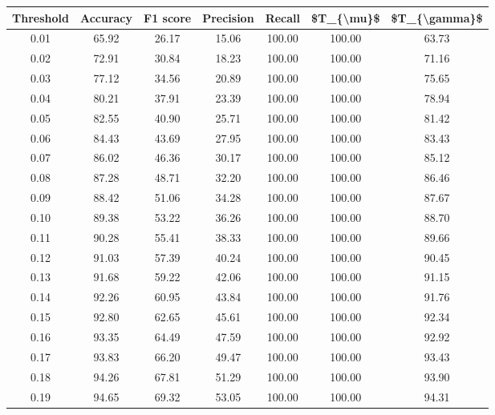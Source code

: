 \begin{tabular}{|c|c|c|c|c|c|c|}
\hline
 Threshold &  Accuracy &  F1 score &  Precision &  Recall &  \$T\_\{\textbackslash mu\}\$ &  \$T\_\{\textbackslash gamma\}\$ \\
\hline
      0.01 &     65.92 &     26.17 &      15.06 &  100.00 &     100.00 &         63.73 \\
      0.02 &     72.91 &     30.84 &      18.23 &  100.00 &     100.00 &         71.16 \\
      0.03 &     77.12 &     34.56 &      20.89 &  100.00 &     100.00 &         75.65 \\
      0.04 &     80.21 &     37.91 &      23.39 &  100.00 &     100.00 &         78.94 \\
      0.05 &     82.55 &     40.90 &      25.71 &  100.00 &     100.00 &         81.42 \\
      0.06 &     84.43 &     43.69 &      27.95 &  100.00 &     100.00 &         83.43 \\
      0.07 &     86.02 &     46.36 &      30.17 &  100.00 &     100.00 &         85.12 \\
      0.08 &     87.28 &     48.71 &      32.20 &  100.00 &     100.00 &         86.46 \\
      0.09 &     88.42 &     51.06 &      34.28 &  100.00 &     100.00 &         87.67 \\
      0.10 &     89.38 &     53.22 &      36.26 &  100.00 &     100.00 &         88.70 \\
      0.11 &     90.28 &     55.41 &      38.33 &  100.00 &     100.00 &         89.66 \\
      0.12 &     91.03 &     57.39 &      40.24 &  100.00 &     100.00 &         90.45 \\
      0.13 &     91.68 &     59.22 &      42.06 &  100.00 &     100.00 &         91.15 \\
      0.14 &     92.26 &     60.95 &      43.84 &  100.00 &     100.00 &         91.76 \\
      0.15 &     92.80 &     62.65 &      45.61 &  100.00 &     100.00 &         92.34 \\
      0.16 &     93.35 &     64.49 &      47.59 &  100.00 &     100.00 &         92.92 \\
      0.17 &     93.83 &     66.20 &      49.47 &  100.00 &     100.00 &         93.43 \\
      0.18 &     94.26 &     67.81 &      51.29 &  100.00 &     100.00 &         93.90 \\
      0.19 &     94.65 &     69.32 &      53.05 &  100.00 &     100.00 &         94.31 \\

\end{tabular}
